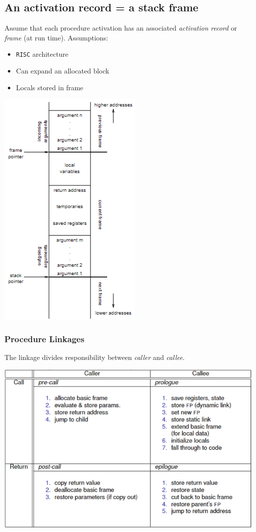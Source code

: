 \documentclass[10pt]{article}
\begin{document}
\subsection*{An activation record = a stack frame}
Assume that each procedure activation has an associated \textit{activation record} or \textit{frame} (at run time).
Assumptions:
\begin{itemize}
    \item \texttt{RISC} architecture
    \item Can expand an allocated block
    \item Locals stored in frame
\end{itemize}
\begin{center}
    \includegraphics*[scale=1]{W6_5.png}
\end{center}

\subsubsection*{Procedure Linkages}
The linkage divides responsibility between \textit{caller} and \textit{callee}.
\begin{center}
    \includegraphics*[scale=0.8]{W6_6.png}
\end{center}
\end{document}

